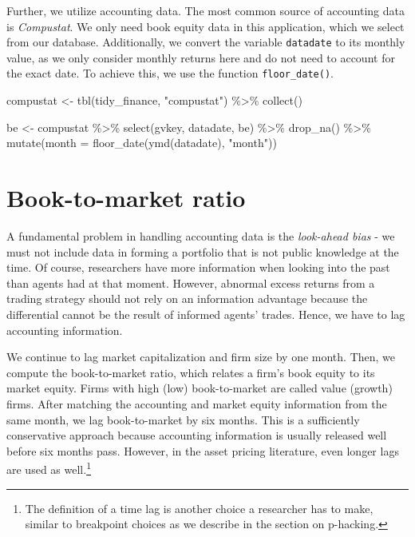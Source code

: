 \documentclass[
]{krantz}
\newenvironment{Shaded}{\begin{snugshade}}{\end{snugshade}}
\newcommand{\AttributeTok}[1]{\textcolor[rgb]{0.61,0.61,0.61}{#1}}
\newcommand{\FunctionTok}[1]{\textcolor[rgb]{0,0,0}{#1}}
\newcommand{\NormalTok}[1]{#1}
\newcommand{\OtherTok}[1]{\textcolor[rgb]{0.37,0.37,0.37}{#1}}
\newcommand{\SpecialCharTok}[1]{\textcolor[rgb]{0,0,0}{#1}}
\newcommand{\StringTok}[1]{\textcolor[rgb]{0.5,0.5,0.5}{#1}}
\begin{document}
Further, we utilize accounting data. The most common source of accounting data is \emph{Compustat}. We only need book equity data in this application, which we select from our database. Additionally, we convert the variable \texttt{datadate} to its monthly value, as we only consider monthly returns here and do not need to account for the exact date. To achieve this, we use the function \texttt{floor\_date()}.

\begin{Shaded}
\begin{Highlighting}[]
\NormalTok{compustat }\OtherTok{\textless{}{-}} \FunctionTok{tbl}\NormalTok{(tidy\_finance, }\StringTok{"compustat"}\NormalTok{) }\SpecialCharTok{\%\textgreater{}\%}
  \FunctionTok{collect}\NormalTok{()}

\NormalTok{be }\OtherTok{\textless{}{-}}\NormalTok{ compustat }\SpecialCharTok{\%\textgreater{}\%}
  \FunctionTok{select}\NormalTok{(gvkey, datadate, be) }\SpecialCharTok{\%\textgreater{}\%}
  \FunctionTok{drop\_na}\NormalTok{() }\SpecialCharTok{\%\textgreater{}\%}
  \FunctionTok{mutate}\NormalTok{(}\AttributeTok{month =} \FunctionTok{floor\_date}\NormalTok{(}\FunctionTok{ymd}\NormalTok{(datadate), }\StringTok{"month"}\NormalTok{))}
\end{Highlighting}
\end{Shaded}

\hypertarget{book-to-market-ratio}{%
\section{Book-to-market ratio}\label{book-to-market-ratio}}

A fundamental problem in handling accounting data is the \emph{look-ahead bias} - we must not include data in forming a portfolio that is not public knowledge at the time. Of course, researchers have more information when looking into the past than agents had at that moment. However, abnormal excess returns from a trading strategy should not rely on an information advantage because the differential cannot be the result of informed agents' trades. Hence, we have to lag accounting information.

We continue to lag market capitalization and firm size by one month. Then, we compute the book-to-market ratio, which relates a firm's book equity to its market equity. Firms with high (low) book-to-market are called value (growth) firms. After matching the accounting and market equity information from the same month, we lag book-to-market by six months. This is a sufficiently conservative approach because accounting information is usually released well before six months pass. However, in the asset pricing literature, even longer lags are used as well.\footnote{The definition of a time lag is another choice a researcher has to make, similar to breakpoint choices as we describe in the section on p-hacking.}
\end{document}
